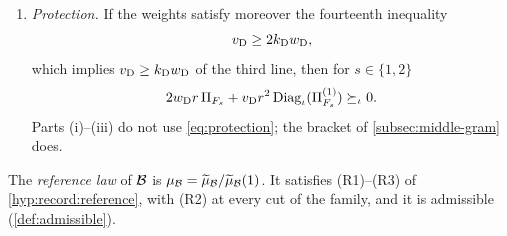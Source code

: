 \begin{lemma}
\begin{enumerate}[label=(\roman*)]
\[ \]
 is a nonnegative measure on $X_{\Blk}^V$ of mass at least one, reflection
 positive at every cut of the family (the chamber cuts of both
 coordinates and $\iota$), and invariant under the layer swap and under the
 square-affine maps of (R3) of \cref{hyp:record:reference}; in particular
 its one-slot marginals are its mass times the uniform law.
\item \emph{Protection.} If the weights satisfy moreover the fourteenth
 inequality
 \begin{equation}\label{eq:protection}
  v_{\rm D}\ge2k_{\rm D}w_{\rm D},
 \end{equation}
 which implies $v_{\rm D}\ge k_{\rm D}w_{\rm D}$ of the third line, then for
 $s\in\{1,2\}$
 \[
  2w_{\rm D}r\,\Pi_{F_s}+v_{\rm D}r^2\operatorname{Diag}_\iota(\Pi^{(1)}_{F_s})
  \succeq_\iota0.
 \]
 Parts (i)--(iii) do not use \eqref{eq:protection}; the bracket of
 \cref{subsec:middle-gram} does.
\end{enumerate}
The \emph{reference law} of $\mathcal B$ is
$\mu_{\mathcal B}=\widetilde\mu_{\mathcal B}/\widetilde\mu_{\mathcal B}(1)$. It satisfies (R1)--(R3)
of \cref{hyp:record:reference}, with (R2) at every cut of the family, and it
is admissible (\cref{def:admissible}).
\end{lemma}

